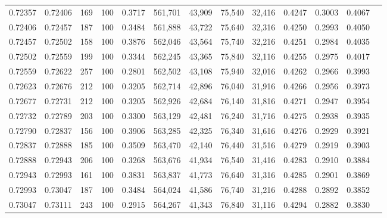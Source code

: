 \begin{tabular}{rrrrrrrrrrrrr}
0.72357 & 0.72406 &   169 & 100 &                                     0.3717 & 561,701 &  43,909 &  75,540 &  32,416 & 0.4247 & 0.3003 & 0.4067 \\
0.72406 & 0.72457 &   187 & 100 &                                     0.3484 & 561,888 &  43,722 &  75,640 &  32,316 & 0.4250 & 0.2993 & 0.4050 \\
0.72457 & 0.72502 &   158 & 100 &                                     0.3876 & 562,046 &  43,564 &  75,740 &  32,216 & 0.4251 & 0.2984 & 0.4035 \\
0.72502 & 0.72559 &   199 & 100 &                                     0.3344 & 562,245 &  43,365 &  75,840 &  32,116 & 0.4255 & 0.2975 & 0.4017 \\
0.72559 & 0.72622 &   257 & 100 &                                     0.2801 & 562,502 &  43,108 &  75,940 &  32,016 & 0.4262 & 0.2966 & 0.3993 \\
0.72623 & 0.72676 &   212 & 100 &                                     0.3205 & 562,714 &  42,896 &  76,040 &  31,916 & 0.4266 & 0.2956 & 0.3973 \\
0.72677 & 0.72731 &   212 & 100 &                                     0.3205 & 562,926 &  42,684 &  76,140 &  31,816 & 0.4271 & 0.2947 & 0.3954 \\
0.72732 & 0.72789 &   203 & 100 &                                     0.3300 & 563,129 &  42,481 &  76,240 &  31,716 & 0.4275 & 0.2938 & 0.3935 \\
0.72790 & 0.72837 &   156 & 100 &                                     0.3906 & 563,285 &  42,325 &  76,340 &  31,616 & 0.4276 & 0.2929 & 0.3921 \\
0.72837 & 0.72888 &   185 & 100 &                                     0.3509 & 563,470 &  42,140 &  76,440 &  31,516 & 0.4279 & 0.2919 & 0.3903 \\
0.72888 & 0.72943 &   206 & 100 &                                     0.3268 & 563,676 &  41,934 &  76,540 &  31,416 & 0.4283 & 0.2910 & 0.3884 \\
0.72943 & 0.72993 &   161 & 100 &                                     0.3831 & 563,837 &  41,773 &  76,640 &  31,316 & 0.4285 & 0.2901 & 0.3869 \\
0.72993 & 0.73047 &   187 & 100 &                                     0.3484 & 564,024 &  41,586 &  76,740 &  31,216 & 0.4288 & 0.2892 & 0.3852 \\
0.73047 & 0.73111 &   243 & 100 &                                     0.2915 & 564,267 &  41,343 &  76,840 &  31,116 & 0.4294 & 0.2882 & 0.3830 \\

\end{tabular}
